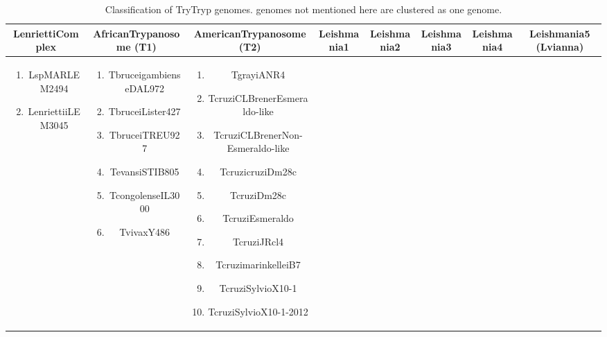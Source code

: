 \documentclass[table,
12pt, %
a4paper, %
oneside, %
headinclude,footinclude, %
BCOR5mm, %
]{scrartcl}
\begin{document}
\begin{table}[hbt]
  \caption{Classification of TryTryp genomes. genomes not mentioned here are clustered as one genome.}
  \begin{adjustbox}{width=\columnwidth,center}
    \begin{tabular}{|c|c|c|c|c|c|c|c|}
      \toprule LenriettiComplex                           & AfricanTrypanosome (T1)                              & AmericanTrypanosome (T2)                               & Leishmania1                                        & Leishmania2                                        & Leishmania3                                        & Leishmania4                                        & Leishmania5 (Lvianna)                              \\\midrule
      \parbox{.45\textwidth} {\begin{enumerate}
          \item LspMARLEM2494
          \item LenriettiiLEM3045
        \end{enumerate}} & \parbox{.45\textwidth}{\begin{enumerate}
          \item TbruceigambienseDAL972
          \item TbruceiLister427
          \item TbruceiTREU927
          \item TevansiSTIB805
          \item TcongolenseIL3000
          \item TvivaxY486
        \end{enumerate}} & \parbox{.45\textwidth}{\begin{enumerate}
          \item TgrayiANR4
          \item TcruziCLBrenerEsmeraldo-like
          \item TcruziCLBrenerNon-Esmeraldo-like
          \item TcruzicruziDm28c
          \item TcruziDm28c
          \item TcruziEsmeraldo
          \item TcruziJRcl4
          \item TcruzimarinkelleiB7
          \item TcruziSylvioX10-1
          \item TcruziSylvioX10-1-2012

\end{enumerate}}
\end{tabular}
\end{adjustbox}
\end{table}
\end{document}
